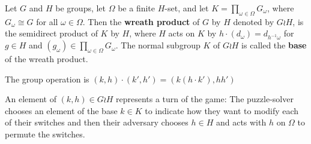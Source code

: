 \begin{definition}
  Let $G$ and $H$ be groups,
  let $\Omega$ be a finite $H$-set, and
  let $K = \prod_{\omega \in \Omega} G_\omega$, where $G_\omega \cong G$
  for all $\omega \in \Omega$.
  Then the \textbf{wreath product} of $G$ by $H$ denoted by $G \wr H$,
  is the semidirect product of $K$ by $H$,
  where $H$ acts on $K$ by $h \cdot (d_\omega) = d_{h^{-1}\omega}$ for $g \in H$ and
  $(g_\omega) \in \prod_{\omega \in \Omega} G_\omega$.
  The normal subgroup $K$ of $G \wr H$ is called
  the \textbf{base} of the wreath product.

  The group operation is $(k, h) \cdot (k', h') = (k(h \cdot k'), hh')$
\end{definition}

An element of $(k, h) \in G \wr H$ represents a turn of the game:
The puzzle-solver chooses an element of the base $k \in K$ to indicate
how they want to modify each of their switches
and then their adversary chooses $h \in H$ and acts with $h$ on $\Omega$ to
permute the switches.

